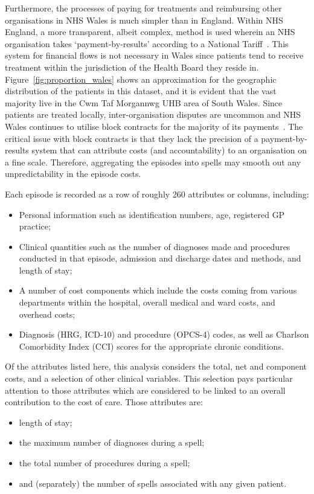 Furthermore, the processes of paying for treatments and reimbursing other
organisations in NHS Wales is much simpler than in England. Within NHS England,
a more transparent, albeit complex, method is used wherein an NHS organisation
takes `payment-by-results' according to a National Tariff~\cite{BMA2020,UK2011}.
This system for financial flows is not necessary in Wales since patients tend to
receive treatment within the jurisdiction of the Health Board they reside in.
Figure~\ref{fig:proportion_wales} shows an approximation for the geographic
distribution of the patients in this dataset, and it is evident that the vast
majority live in the Cwm Taf Morgannwg UHB area of South Wales. Since patients
are treated locally, inter-organisation disputes are uncommon and NHS Wales
continues to utilise block contracts for the majority of its
payments~\cite{BMA2020}. The critical issue with block contracts is that they
lack the precision of a payment-by-results system that can attribute costs (and
accountability) to an organisation on a fine scale. Therefore, aggregating the
episodes into spells may smooth out any unpredictability in the episode costs.

Each episode is recorded as a row of roughly 260 attributes or columns,
including:
\begin{itemize}
    \item Personal information such as identification numbers, age, registered
        GP practice;
    \item Clinical quantities such as the number of diagnoses made and
        procedures conducted in that episode, admission and discharge dates and
        methods, and length of stay;
    \item A number of cost components which include the costs coming from
        various departments within the hospital, overall medical and ward costs,
        and overhead costs;
    \item Diagnosis (HRG, ICD-10) and procedure (OPCS-4) codes, as well as
        Charlson Comorbidity Index (CCI) scores for the appropriate chronic
        conditions.
\end{itemize}

Of the attributes listed here, this analysis considers the total, net and
component costs, and a selection of other clinical variables. This selection
pays particular attention to those attributes which are considered to be linked
to an overall contribution to the cost of care. Those attributes are: 
\begin{itemize}
    \item length of stay; 
    \item the maximum number of diagnoses during a spell;
    \item the total number of procedures during a spell;
    \item and (separately) the number of spells associated with any given
        patient.
\end{itemize}

